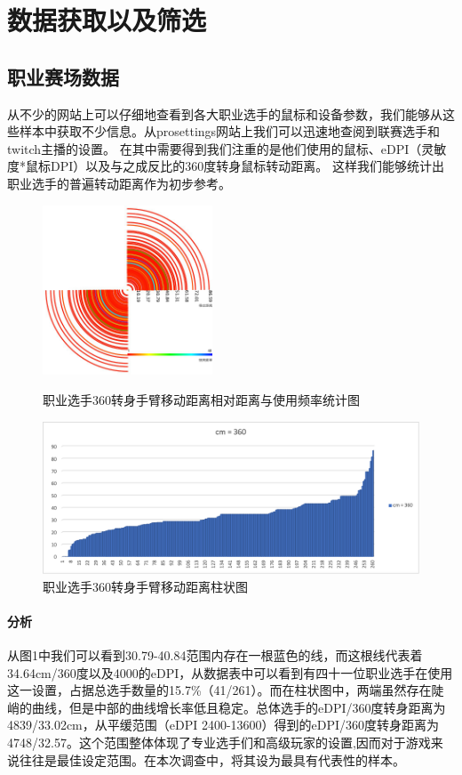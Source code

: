 \documentclass[UTF8]{ctexart}
\begin{document}
\section{数据获取以及筛选}
\subsection{职业赛场数据}
    从不少的网站上可以仔细地查看到各大职业选手的鼠标和设备参数，我们能够从这些样本中获取不少信息。从prosettings网站上我们可以迅速地查阅到联赛选手和twitch主播的设置。 \cite{prosetting_edpi}在其中需要得到我们注重的是他们使用的鼠标、eDPI（灵敏度*鼠标DPI）以及与之成反比的360度转身鼠标转动距离。 \cite{prosetting_guide}这样我们能够统计出职业选手的普遍转动距离作为初步参考。
\begin{figure}[htbp]
    \centering
    \includegraphics[width=0.45\textwidth]{out.jpg}
    \caption{职业选手360转身手臂移动距离相对距离与使用频率统计图}
    \centering
    \includegraphics[width=1\textwidth]{proDataPoly.png}
    \caption{职业选手360转身手臂移动距离柱状图}
\end{figure}
\paragraph{分析}
    从图1中我们可以看到30.79-40.84范围内存在一根蓝色的线，而这根线代表着34.64cm/360度以及4000的eDPI，从数据表中可以看到有四十一位职业选手在使用这一设置，占据总选手数量的15.7\%（41/261）。而在柱状图中，两端虽然存在陡峭的曲线，但是中部的曲线增长率低且稳定。总体选手的eDPI/360度转身距离为4839/33.02cm，从平缓范围（eDPI 2400-13600）得到的eDPI/360度转身距离为4748/32.57。这个范围整体体现了专业选手们和高级玩家的设置,因而对于游戏来说往往是最佳设定范围。在本次调查中，将其设为最具有代表性的样本。
\end{document}
